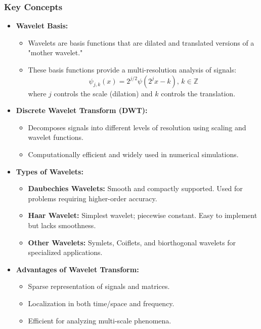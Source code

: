 \documentclass[12pt]{article}
\begin{document}
\subsubsection{Key Concepts}
\begin{itemize}
    \item \textbf{Wavelet Basis:}
          \begin{itemize}
              \item Wavelets are basis functions that are dilated and translated versions of a "mother wavelet."
              \item These basis functions provide a multi-resolution analysis of signals:
                    \[
                        \psi_{j,k}(x) = 2^{j/2} \psi(2^j x - k), \, k \in \mathbb{Z}
                    \]
                    where \(j\) controls the scale (dilation) and \(k\) controls the translation.
          \end{itemize}
    \item \textbf{Discrete Wavelet Transform (DWT):}
          \begin{itemize}
              \item Decomposes signals into different levels of resolution using scaling and wavelet functions.
              \item Computationally efficient and widely used in numerical simulations.
          \end{itemize}
    \item \textbf{Types of Wavelets:}
          \begin{itemize}
              \item \textbf{Daubechies Wavelets:} Smooth and compactly supported. Used for problems requiring higher-order accuracy.
              \item \textbf{Haar Wavelet:} Simplest wavelet; piecewise constant. Easy to implement but lacks smoothness.
              \item \textbf{Other Wavelets:} Symlets, Coiflets, and biorthogonal wavelets for specialized applications.
          \end{itemize}
    \item \textbf{Advantages of Wavelet Transform:}
          \begin{itemize}
              \item Sparse representation of signals and matrices.
              \item Localization in both time/space and frequency.
              \item Efficient for analyzing multi-scale phenomena.
          \end{itemize}
\end{itemize}
\end{document}

